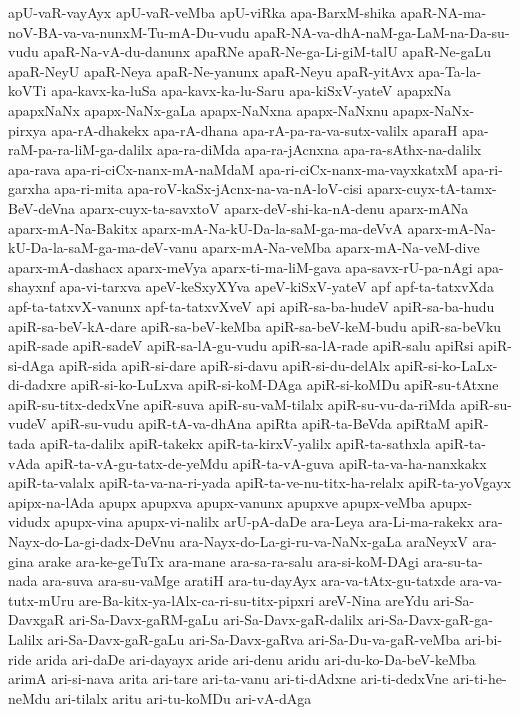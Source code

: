 {apU-vaR-vayAyx
apU-vaR-veMba
apU-viRka
apa-BarxM-shika
apaR-NA-ma-noV-BA-va-va-nunxM-Tu-mA-Du-vudu
apaR-NA-va-dhA-naM-ga-LaM-na-Da-su-vudu
apaR-Na-vA-du-danunx
apaRNe
apaR-Ne-ga-Li-giM-talU
apaR-Ne-gaLu
apaR-NeyU
apaR-Neya
apaR-Ne-yanunx
apaR-Neyu
apaR-yitAvx
apa-Ta-la-koVTi
apa-kavx-ka-luSa
apa-kavx-ka-lu-Saru
apa-kiSxV-yateV
apapxNa
apapxNaNx
apapx-NaNx-gaLa
apapx-NaNxna
apapx-NaNxnu
apapx-NaNx-pirxya
apa-rA-dhakekx
apa-rA-dhana
apa-rA-pa-ra-va-sutx-valilx
aparaH
apa-raM-pa-ra-liM-ga-dalilx
apa-ra-diMda
apa-ra-jAcnxna
apa-ra-sAthx-na-dalilx
apa-rava
apa-ri-ciCx-nanx-mA-naMdaM
apa-ri-ciCx-nanx-ma-vayxkatxM
apa-ri-garxha
apa-ri-mita
apa-roV-kaSx-jAcnx-na-va-nA-loV-cisi
aparx-cuyx-tA-tamx-BeV-deVna
aparx-cuyx-ta-savxtoV
aparx-deV-shi-ka-nA-denu
aparx-mANa
aparx-mA-Na-Bakitx
aparx-mA-Na-kU-Da-la-saM-ga-ma-deVvA
aparx-mA-Na-kU-Da-la-saM-ga-ma-deV-vanu
aparx-mA-Na-veMba
aparx-mA-Na-veM-dive
aparx-mA-dashacx
aparx-meVya
aparx-ti-ma-liM-gava
apa-savx-rU-pa-nAgi
apa-shayxnf
apa-vi-tarxva
apeV-keSxyXYva
apeV-kiSxV-yateV
apf
apf-ta-tatxvXda
apf-ta-tatxvX-vanunx
apf-ta-tatxvXveV
api
apiR-sa-ba-hudeV
apiR-sa-ba-hudu
apiR-sa-beV-kA-dare
apiR-sa-beV-keMba
apiR-sa-beV-keM-budu
apiR-sa-beVku
apiR-sade
apiR-sadeV
apiR-sa-lA-gu-vudu
apiR-sa-lA-rade
apiR-salu
apiRsi
apiR-si-dAga
apiR-sida
apiR-si-dare
apiR-si-davu
apiR-si-du-delAlx
apiR-si-ko-LaLx-di-dadxre
apiR-si-ko-LuLxva
apiR-si-koM-DAga
apiR-si-koMDu
apiR-su-tAtxne
apiR-su-titx-dedxVne
apiR-suva
apiR-su-vaM-tilalx
apiR-su-vu-da-riMda
apiR-su-vudeV
apiR-su-vudu
apiR-tA-va-dhAna
apiRta
apiR-ta-BeVda
apiRtaM
apiR-tada
apiR-ta-dalilx
apiR-takekx
apiR-ta-kirxV-yalilx
apiR-ta-sathxla
apiR-ta-vAda
apiR-ta-vA-gu-tatx-de-yeMdu
apiR-ta-vA-guva
apiR-ta-va-ha-nanxkakx
apiR-ta-valalx
apiR-ta-va-na-ri-yada
apiR-ta-ve-nu-titx-ha-relalx
apiR-ta-yoVgayx
apipx-na-lAda
apupx
apupxva
apupx-vanunx
apupxve
apupx-veMba
apupx-vidudx
apupx-vina
apupx-vi-nalilx
arU-pA-daDe
ara-Leya
ara-Li-ma-rakekx
ara-Nayx-do-La-gi-dadx-DeVnu
ara-Nayx-do-La-gi-ru-va-NaNx-gaLa
araNeyxV
ara-gina
arake
ara-ke-geTuTx
ara-mane
ara-sa-ra-salu
ara-si-koM-DAgi
ara-su-ta-nada
ara-suva
ara-su-vaMge
aratiH
ara-tu-dayAyx
ara-va-tAtx-gu-tatxde
ara-va-tutx-mUru
are-Ba-kitx-ya-lAlx-ca-ri-su-titx-pipxri
areV-Nina
areYdu
ari-Sa-DavxgaR
ari-Sa-Davx-gaRM-gaLu
ari-Sa-Davx-gaR-dalilx
ari-Sa-Davx-gaR-ga-Lalilx
ari-Sa-Davx-gaR-gaLu
ari-Sa-Davx-gaRva
ari-Sa-Du-va-gaR-veMba
ari-bi-ride
arida
ari-daDe
ari-dayayx
aride
ari-denu
aridu
ari-du-ko-Da-beV-keMba
arimA
ari-si-nava
arita
ari-tare
ari-ta-vanu
ari-ti-dAdxne
ari-ti-dedxVne
ari-ti-he-neMdu
ari-tilalx
aritu
ari-tu-koMDu
ari-vA-dAga
}

